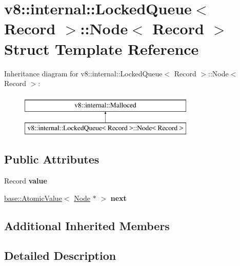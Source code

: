 \hypertarget{structv8_1_1internal_1_1LockedQueue_1_1Node}{}\section{v8\+:\+:internal\+:\+:Locked\+Queue$<$ Record $>$\+:\+:Node$<$ Record $>$ Struct Template Reference}
\label{structv8_1_1internal_1_1LockedQueue_1_1Node}
Inheritance diagram for v8\+:\+:internal\+:\+:Locked\+Queue$<$ Record $>$\+:\+:Node$<$ Record $>$\+:\begin{figure}[H]
\begin{center}
\leavevmode
\includegraphics[height=2.000000cm]{structv8_1_1internal_1_1LockedQueue_1_1Node}
\end{center}
\end{figure}
\subsection*{Public Attributes}
\begin{DoxyCompactItemize}
\item 
\mbox{\label{structv8_1_1internal_1_1LockedQueue_1_1Node_aab7943887fe8f0297b50008920203c82}} 
Record {\bfseries value}
\item 
\mbox{\label{structv8_1_1internal_1_1LockedQueue_1_1Node_abbc1e001cf9547bf6609c9e9e82da026}} 
\mbox{\hyperlink{classv8_1_1base_1_1AtomicValue}{base\+::\+Atomic\+Value}}$<$ \mbox{\hyperlink{structv8_1_1internal_1_1LockedQueue_1_1Node}{Node}} $\ast$ $>$ {\bfseries next}
\end{DoxyCompactItemize}
\subsection*{Additional Inherited Members}


\subsection{Detailed Description}
